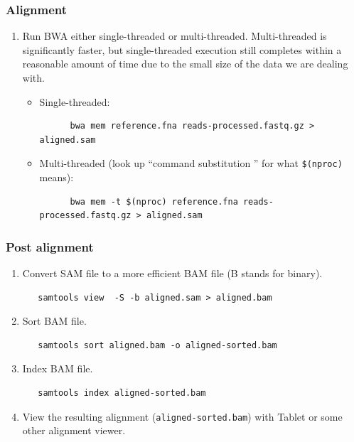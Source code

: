 \documentclass[12pt,letterpaper]{article}
\begin{document}
\subsubsection{Alignment}

\begin{enumerate}
   \item Run BWA either single-threaded or multi-threaded. Multi-threaded is significantly faster, but single-threaded execution still completes within a reasonable amount of time due to the small size of the data we are dealing with.
   \begin{itemize}
      \item Single-threaded:
      \begin{verbatim}
      bwa mem reference.fna reads-processed.fastq.gz > aligned.sam
      \end{verbatim}
      \item Multi-threaded (look up ``command substitution '' for what \texttt{\$(nproc)} means):
      \begin{verbatim}
      bwa mem -t $(nproc) reference.fna reads-processed.fastq.gz > aligned.sam
      \end{verbatim}
   \end{itemize}
\end{enumerate}

\subsubsection{Post alignment}

\begin{enumerate}
   \item Convert SAM file to a more efficient BAM file (B stands for binary). \begin{verbatim}
   samtools view  -S -b aligned.sam > aligned.bam
   \end{verbatim}
   \item Sort BAM file. \begin{verbatim}
   samtools sort aligned.bam -o aligned-sorted.bam
   \end{verbatim}
   \item Index BAM file. \begin{verbatim}
   samtools index aligned-sorted.bam
   \end{verbatim}
   \item View the resulting alignment (\texttt{aligned-sorted.bam}) with Tablet or some other alignment viewer.
\end{enumerate}
\end{document}
